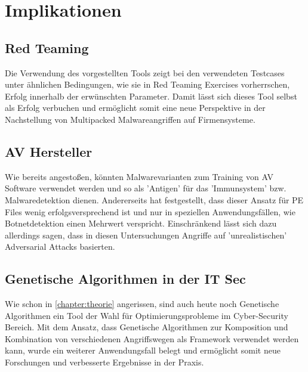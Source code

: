 \section{Implikationen}
\subsection{Red Teaming}
Die Verwendung des vorgestellten Tools zeigt bei den verwendeten Testcases unter ähnlichen Bedingungen, wie sie in Red Teaming Exercises vorherrschen, Erfolg innerhalb der erwünschten Parameter. Damit lässt sich dieses Tool selbst als Erfolg verbuchen und ermöglicht somit eine neue Perspektive in der Nachstellung von Multipacked Malwareangriffen auf Firmensysteme. 
\subsection{AV Hersteller}
Wie \cite{murali_2023_evolving} bereits angestoßen, könnten Malwarevarianten zum Training  von AV Software verwendet werden und so als 'Antigen' für das 'Immunsystem' bzw. Malwaredetektion dienen. Andererseits hat\cite{dyrmishi_2023_on} festgestellt, dass dieser Ansatz für PE Files wenig erfolgsversprechend ist und nur in speziellen Anwendungsfällen, wie Botnetdetektion einen Mehrwert verspricht. Einschränkend lässt sich dazu allerdings sagen, dass in diesen Untersuchungen Angriffe auf 'unrealistischen' Adversarial Attacks basierten.
\subsection{Genetische Algorithmen in der IT Sec}
Wie schon in \ref{chapter:theorie} angerissen, sind auch heute noch Genetische Algorithmen ein Tool der Wahl für Optimierungsprobleme im Cyber-Security Bereich. Mit dem Ansatz, dass Genetische Algorithmen zur Komposition und Kombination von verschiedenen Angriffswegen als Framework verwendet werden kann, wurde ein weiterer Anwendungsfall belegt und ermöglicht somit neue Forschungen und verbesserte Ergebnisse in der Praxis.